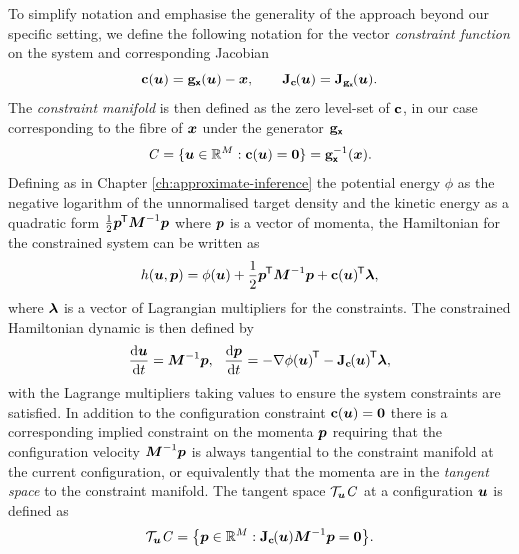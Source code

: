 To simplify notation and emphasise the generality of the approach beyond our specific setting, we define the following notation for the vector \emph{constraint function} on the system and corresponding Jacobian
\begin{equation}\label{eq:constraint-def}
  \vctfunc{c}(\vct{u}) = \genfunc_{\rvct{x}}(\vct{u}) - \vct{x},
  \qquad
  \jacob{\vctfunc{c}}{\vct{u}} = \jacob{\genfunc_{\rvct{x}}}{\vct{u}}.
\end{equation}
The \emph{constraint manifold} is then defined as the zero level-set of ${\mathbf{c}}$, in our case corresponding to the fibre of $\boldsymbol{x}$ under the generator ${\mathbf{g}}_{\boldsymbol{\mathsf{x}}}$
\begin{equation}\label{eq:constraint-manifold-def}
  \mathit{C} = \lbrace \boldsymbol{u} \in \mathbb{R}^M : {\mathbf{c}}(\boldsymbol{u}) = \boldsymbol{0} \rbrace =
  {\mathbf{g}}_{\boldsymbol{\mathsf{x}}}^{-1}(\boldsymbol{x}).
\end{equation}
Defining as in Chapter \ref{ch:approximate-inference} the potential energy $\phi$ as the negative logarithm of the unnormalised target density and the kinetic energy as a quadratic form $\frac{1}{2}\boldsymbol{p}^{\mkern-1.5mu\mathsf{T}}\boldsymbol{M}^{-1}\boldsymbol{p}$ where $\boldsymbol{p}$ is a vector of momenta, the Hamiltonian for the constrained system can be written as
\begin{equation}\label{eq:constrained-hamiltonian}
    h(\boldsymbol{u}, \boldsymbol{p}) = 
    \phi(\boldsymbol{u}) + \frac{1}{2}\boldsymbol{p}^{\mkern-1.5mu\mathsf{T}}\boldsymbol{M}^{-1}\boldsymbol{p}
    + {\mathbf{c}}(\boldsymbol{u})^{\mkern-1.5mu\mathsf{T}}\boldsymbol{\lambda},
\end{equation}
where $\boldsymbol{\lambda}$ is a vector of Lagrangian multipliers for the constraints. The constrained Hamiltonian dynamic is then defined by
\begin{equation}\label{eq:constrained-hamiltonian-dynamic}
    \td{\vct{u}}{t} = \mtx{M}^{-1}\vct{p},
    ~~
    \td{\vct{p}}{t} = -\grad{\phi}{\vct{u}}\tr - \jacob{\vctfunc{c}}{\vct{u}}\tr\vct{\lambda},
\end{equation}
with the Lagrange multipliers taking values to ensure the system constraints are satisfied. In addition to the configuration constraint $\vctfunc{c}\lpa\vct{u}\rpa = \vct{0}$ there is a corresponding implied constraint on the momenta $\boldsymbol{p}$ requiring that the configuration velocity $\boldsymbol{M}^{-1}\boldsymbol{p}$ is always tangential to the constraint manifold at the current configuration, or equivalently that the momenta are in the \emph{tangent space} to the constraint manifold. The tangent space $\mathcal{T}_{\boldsymbol{u}}\mathit{C}$ at a configuration $\boldsymbol{u}$ is defined as
\begin{equation}\label{eq:constraint-tanget-space}
  \sset{T}_{\vct{u}}\set{C} = \lbr \vct{p} \in \reals^M : \jacob{\vctfunc{c}}{\vct{u}}\mtx{M}^{-1}\vct{p} = \vct{0} \rbr.
\end{equation}
